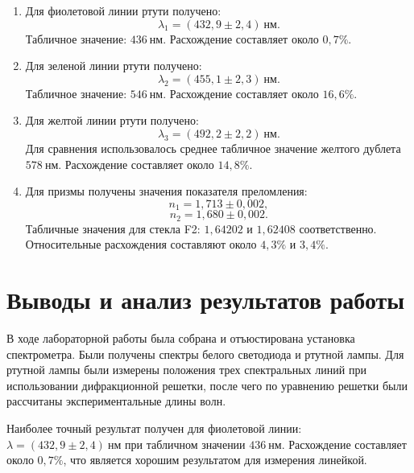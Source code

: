 \documentclass[a4paper,12pt]{article}
\begin{document}
\begin{enumerate}[label=\arabic*.]
    \item Для фиолетовой линии ртути получено:
    \begin{equation}
        \lambda_1=(432{,}9\pm2{,}4)~\text{нм}.
    \end{equation}
    Табличное значение: $436~\text{нм}$. Расхождение составляет около $0{,}7\%$.

    \item Для зеленой линии ртути получено:
    \begin{equation}
        \lambda_2=(455{,}1\pm2{,}3)~\text{нм}.
    \end{equation}
    Табличное значение: $546~\text{нм}$. Расхождение составляет около $16{,}6\%$.

    \item Для желтой линии ртути получено:
    \begin{equation}
        \lambda_3=(492{,}2\pm2{,}2)~\text{нм}.
    \end{equation}
    Для сравнения использовалось среднее табличное значение желтого дублета $578~\text{нм}$. Расхождение составляет около $14{,}8\%$.

    \item Для призмы получены значения показателя преломления:
    \begin{equation}
        n_1 = 1{,}713\pm0{,}002,
    \end{equation}
    \begin{equation}
        n_2 = 1{,}680\pm0{,}002.
    \end{equation}
    Табличные значения для стекла F2: $1{,}64202$ и $1{,}62408$ соответственно. Относительные расхождения составляют около $4{,}3\%$ и $3{,}4\%$.
\end{enumerate}

\section{Выводы и анализ результатов работы}

В ходе лабораторной работы была собрана и отъюстирована установка спектрометра. Были получены спектры белого светодиода и ртутной лампы. Для ртутной лампы были измерены положения трех спектральных линий при использовании дифракционной решетки, после чего по уравнению решетки были рассчитаны экспериментальные длины волн.

Наиболее точный результат получен для фиолетовой линии: $\lambda=(432{,}9\pm2{,}4)~\text{нм}$ при табличном значении $436~\text{нм}$. Расхождение составляет около $0{,}7\%$, что является хорошим результатом для измерения линейкой.
\end{document}
